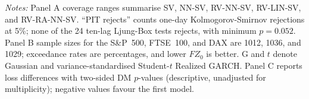 \begin{table}[p]
\vspace{0.35em}
\begin{minipage}{\textwidth}
\scriptsize
\textit{Notes:} Panel A coverage ranges summarise SV, NN-SV, RV-NN-SV, RV-LIN-SV, and RV-RA-NN-SV. ``PIT rejects'' counts one-day Kolmogorov-Smirnov rejections at 5\%; none of the 24 ten-lag Ljung-Box tests rejects, with minimum $p=0.052$. Panel B sample sizes for the S\&P~500, FTSE~100, and DAX are 1012, 1036, and 1029; exceedance rates are percentages, and lower $FZ_0$ is better. G and $t$ denote Gaussian and variance-standardised Student-$t$ Realized GARCH. Panel C reports loss differences with two-sided DM $p$-values (descriptive, unadjusted for multiplicity); negative values favour the first model.
\end{minipage}
\end{table}
